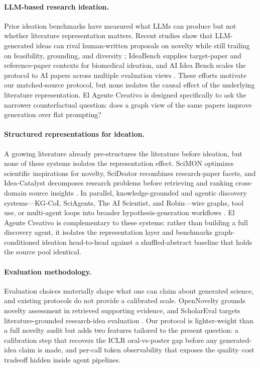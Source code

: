 \documentclass[10pt,twocolumn]{article}
\begin{document}
\paragraph{LLM-based research ideation.}
Prior ideation benchmarks have measured what LLMs can produce but not
whether literature representation matters.  Recent studies show that
LLM-generated ideas can rival human-written proposals on novelty while
still trailing on feasibility, grounding, and diversity
\citep{si2024llmsgeneratenovelresearch,kumar2025largelanguagemodelsunlock};
IdeaBench supplies target-paper and reference-paper contexts for
biomedical ideation, and AI Idea Bench scales the protocol to AI papers
across multiple evaluation views
\citep{guo2025ideabench,qiu2025aiideabench}.  These efforts motivate our
matched-source protocol, but none isolates the causal effect of the
underlying literature representation.  El Agente Creativo is designed
specifically to ask the narrower counterfactual question: does a graph
view of the same papers improve generation over flat prompting?

\paragraph{Structured representations for ideation.}
A growing literature already pre-structures the literature before
ideation, but none of these systems isolates the representation effect.
SciMON optimizes scientific inspirations for novelty, SciDeator recombines
research-paper facets, and Idea-Catalyst decomposes research problems
before retrieving and ranking cross-domain source insights
\citep{wang2024scimon,radensky2024scideator,kargupta2026ideacatalyst}.  In
parallel, knowledge-grounded and agentic discovery systems---KG-CoI,
SciAgents, The AI Scientist, and Robin---wire graphs, tool use, or
multi-agent loops into broader hypothesis-generation workflows
\citep{xiong2024kgcoi,ghafarollahi2024sciagents,lu2024aiscientistfullyautomated,ghareeb2025robin}.
El Agente Creativo is complementary to these systems: rather than building
a full discovery agent, it isolates the representation layer and benchmarks
graph-conditioned ideation head-to-head against a shuffled-abstract
baseline that holds the source pool identical.

\paragraph{Evaluation methodology.}
Evaluation choices materially shape what one can claim about generated
science, and existing protocols do not provide a calibrated scale.
OpenNovelty grounds novelty assessment in retrieved supporting evidence,
and ScholarEval targets literature-grounded research-idea evaluation
\citep{zhang2026opennovelty,moussa2025scholareval}.  Our protocol is
lighter-weight than a full novelty audit but adds two features tailored to
the present question: a calibration step that recovers the ICLR
oral-vs-poster gap before any generated-idea claim is made, and per-call
token observability that exposes the quality--cost tradeoff hidden inside
agent pipelines.
\end{document}
